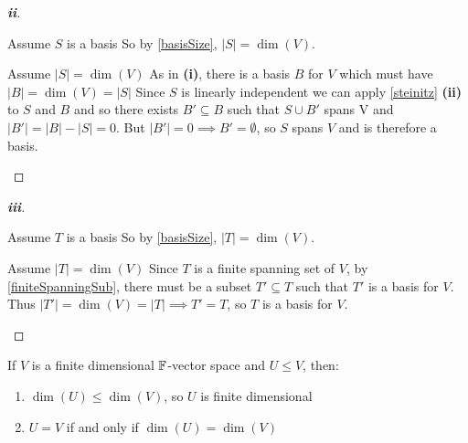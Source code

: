 \documentclass[../main.tex]{subfiles}
\begin{document}
\begin{proof}[\textbf{ii}]
  \begin{proofdirection}{Assume $S$ is a basis}
    So by \cref{basisSize}, $|S| = \dim(V)$.
  \end{proofdirection}
  \begin{proofdirection}{Assume $|S| = \dim(V)$}
    As in \textbf{(i)}, there is a basis $B$ for $V$ which must have $|B| = \dim(V) = |S|$
    Since $S$ is linearly independent we can apply \cref{steinitz} \textbf{(ii)} to $S$ and $B$ and so there exists $B' \subseteq B$ such that $S \cup B'$ spans V and $|B'| = |B| - |S| = 0$.
    But $|B'| = 0 \implies B' = \emptyset$, so $S$ spans $V$ and is therefore a basis.
  \end{proofdirection}
\end{proof}
\begin{proof}[\textbf{iii}]
  \begin{proofdirection}{Assume $T$ is a basis}
    So by \cref{basisSize}, $|T| = \dim(V)$.
  \end{proofdirection}
  \begin{proofdirection}{Assume $|T| = \dim(V)$}
    Since $T$ is a finite spanning set of $V$, by \cref{finiteSpanningSub}, there must be a subset $T' \subseteq T$ such that $T'$ is a basis for $V$.
    Thus $|T'| = \dim(V) = |T| \implies T' = T$, so $T$ is a basis for $V$.
  \end{proofdirection}
\end{proof}
\begin{proposition}
  If $V$ is a finite dimensional $\mathbb{F}$-vector space and $U \leq V$, then: \label{finiteSubspace}
  \begin{enumerate}
    \item $\dim(U) \leq \dim(V)$, so $U$ is finite dimensional
    \item $U = V$ if and only if $\dim(U) = \dim(V)$
  \end{enumerate}
\end{proposition}
\end{document}
